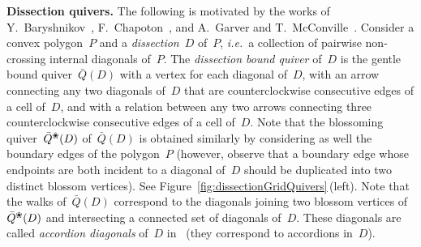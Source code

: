 \documentclass{memo-l}
\theoremstyle{definition}
\newcommand{\fref}[1]{Figure~\ref{#1}} %
\newcommand{\ie}{\textit{i.e.}~} %
\newcommand{\darkblue}{\color{darkblue}} %
\newcommand{\defn}[1]{\textsl{\darkblue #1}} %
\newcommand{\para}[1]{\medskip\noindent\textbf{#1.}} %
\newcommand{\blossom}{^\text{\ding{96}}} %
\begin{document}
\para{Dissection quivers}
The following is motivated by the works of Y.~Baryshnikov~\cite{Baryshnikov}, F.~Chapoton~\cite{Chapoton-quadrangulations}, and A.~Garver and T.~McConville~\cite{GarverMcConville}.
Consider a convex polygon~$P$ and a \defn{dissection}~$D$ of~$P$, \ie a collection of pairwise non-crossing internal diagonals of~$P$.
The \defn{dissection bound quiver} of~$D$ is the gentle bound quiver~$\bar Q(D)$ with a vertex for each diagonal of~$D$, with an arrow connecting any two diagonals of~$D$ that are counterclockwise consecutive edges of a cell of~$D$, and with a relation between any two arrows connecting three counterclockwise consecutive edges of a cell of~$D$.
Note that the blossoming quiver~$\bar Q\blossom(D)$ of~$\bar Q(D)$ is obtained similarly by considering as well the boundary edges of the polygon~$P$ (however, observe that a boundary edge whose endpoints are both incident to a diagonal of~$D$ should be duplicated into two distinct blossom vertices).
See \fref{fig:dissectionGridQuivers}\,(left).
Note that the walks of~$\bar Q(D)$ correspond to the diagonals joining two blossom vertices of~$\bar Q\blossom(D)$ and intersecting a connected set of diagonals of~$D$.
These diagonals are called \defn{accordion diagonals} of~$D$ in~\cite{MannevillePilaud-accordion} (they correspond to accordions in~$D$).
\end{document}

